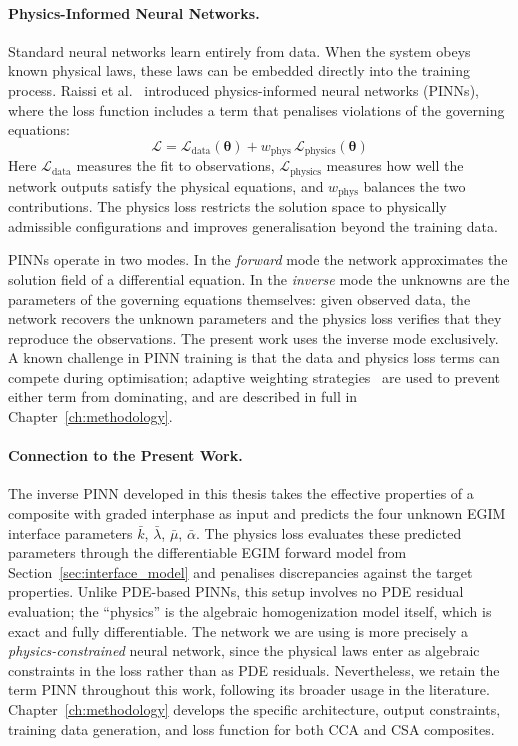 \documentclass[oneside, 12pt, a4paper, bibliography=totoc]{book}
\newcommand{\bs}[1]{\bm{#1}}                       %
\begin{document}
\paragraph{Physics-Informed Neural Networks.}
Standard neural networks learn entirely from data. When the system obeys known physical laws, these laws can be embedded directly into the training process. Raissi et al.~\cite{Raissi2019} introduced physics-informed neural networks (PINNs), where the loss function includes a term that penalises violations of the governing equations:
%
\begin{equation}
    \mathcal{L} = \mathcal{L}_{\text{data}}(\bs{\theta}) + w_{\text{phys}}\,\mathcal{L}_{\text{physics}}(\bs{\theta})
    \label{eq:pinn_loss_general}
\end{equation}
%
Here $\mathcal{L}_{\text{data}}$ measures the fit to observations, $\mathcal{L}_{\text{physics}}$ measures how well the network outputs satisfy the physical equations, and $w_{\text{phys}}$ balances the two contributions. The physics loss restricts the solution space to physically admissible configurations and improves generalisation beyond the training data.

PINNs operate in two modes. In the \textit{forward} mode the network approximates the solution field of a differential equation. In the \textit{inverse} mode the unknowns are the parameters of the governing equations themselves: given observed data, the network recovers the unknown parameters and the physics loss verifies that they reproduce the observations. The present work uses the inverse mode exclusively. A known challenge in PINN training is that the data and physics loss terms can compete during optimisation; adaptive weighting strategies~\cite{Bischof2021} are used to prevent either term from dominating, and are described in full in Chapter~\ref{ch:methodology}.

\paragraph{Connection to the Present Work.}
The inverse PINN developed in this thesis takes the effective properties of a composite with graded interphase as input and predicts the four unknown EGIM interface parameters $\bar{k}$, $\bar{\lambda}$, $\bar{\mu}$, $\bar{\alpha}$. The physics loss evaluates these predicted parameters through the differentiable EGIM forward model from Section~\ref{sec:interface_model} and penalises discrepancies against the target properties. Unlike PDE-based PINNs, this setup involves no PDE residual evaluation; the ``physics'' is the algebraic homogenization model itself, which is exact and fully differentiable. The network we are using is more precisely a \textit{physics-constrained} neural network, since the physical laws enter as algebraic constraints in the loss rather than as PDE residuals. Nevertheless, we retain the term PINN throughout this work, following its broader usage in the literature. Chapter~\ref{ch:methodology} develops the specific architecture, output constraints, training data generation, and loss function for both CCA and CSA composites.
\end{document}
